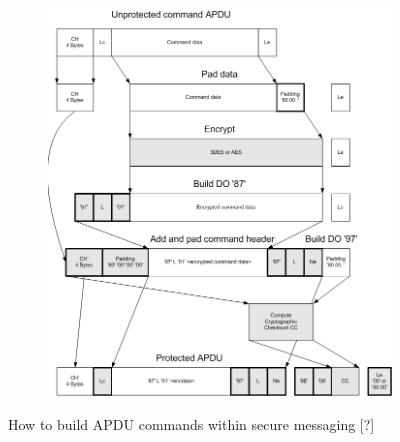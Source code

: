 \documentclass[bsc,frontabs,twoside,singlespacing,parskip,deptreport]{infthesis}     %
\begin{document}
\begin{figure}[H]
\centering
\begin{subfigure}{1\textwidth}
  \includegraphics[width=1\linewidth]
  {images/section_7/7.3/sm_command.png}
\end{subfigure}
\caption{How to build APDU commands within secure messaging [?]}
\end{figure}
\end{document}
